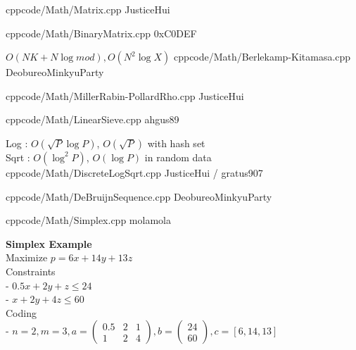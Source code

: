 \documentclass[landscape, 8pt, a4paper, oneside, twocolumn]{extarticle}
\begin{document}
{}{}
{cpp}{code/Math/Matrix.cpp}
{JusticeHui}

{}{}
{cpp}{code/Math/BinaryMatrix.cpp}
{0xC0DEF}

{}{$O(NK + N \log mod), O(N^2 \log X)$}
{cpp}{code/Math/Berlekamp-Kitamasa.cpp}
{DeobureoMinkyuParty}

{}{}
{cpp}{code/Math/MillerRabin-PollardRho.cpp}
{JusticeHui}

{}{}
{cpp}{code/Math/LinearSieve.cpp}
{ahgus89}

{}{Log : $O(\sqrt P \log P)$, $O(\sqrt P)$ with hash set\\Sqrt : $O(\log^2 P)$, $O(\log P)$ in random data}
{cpp}{code/Math/DiscreteLogSqrt.cpp}
{JusticeHui / gratus907}

{}{}
{cpp}{code/Math/DeBruijnSequence.cpp}
{DeobureoMinkyuParty}

{}{}
{cpp}{code/Math/Simplex.cpp}
{molamola}

\noindent
\textbf{Simplex Example}\\
Maximize $p = 6x + 14y + 13z$\\
Constraints \\
- $0.5x + 2y + z \leq 24$\\
- $x + 2y + 4z \leq 60$\\
Coding\\
- $n = 2, m = 3, a = \begin{pmatrix} 0.5 & 2 & 1 \\ 1 & 2 & 4 \end{pmatrix}, b = \begin{pmatrix} 24 \\ 60 \end{pmatrix}, c = [6, 14, 13]$
\end{document}
